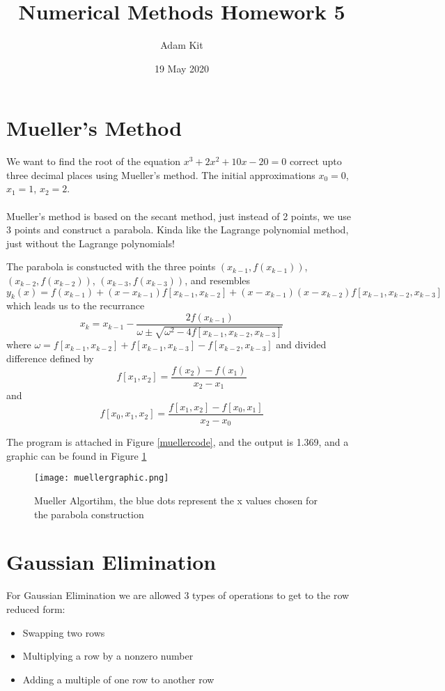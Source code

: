 \documentclass{article}
\title{Numerical Methods Homework 5}
\author{Adam Kit}
\date{19 May 2020}
\begin{document}
\maketitle
\section{Mueller's Method}
We want to find the root of the equation $x^3 + 2x^2 + 10x - 20 = 0$ correct upto three decimal places using Mueller's method. The initial approximations $x_0 = 0$, $x_1 = 1$, $x_2 = 2$.
\\  \\
Mueller's method is based on the secant method, just instead of 2 points, we use 3 points and construct a parabola. Kinda like the Lagrange polynomial method, just without the Lagrange polynomials!

The parabola is constucted with the three points $(x_{k-1}, f(x_{k-1}))$, $(x_{k-2}, f(x_{k-2}))$, $(x_{k-3}, f(x_{k-3}))$, and resembles $$y_k(x) = f(x_{k-1}) + (x-x_{k-1}) f[x_{k-1}, x_{k-2}] + (x-x_{k-1}) (x-x_{k-2}) f[x_{k-1}, x_{k-2}, x_{k-3}]$$ which leads us to the recurrance
$$x_k = x_{k-1} - \frac{2f(x_{k-1})}{\omega \pm \sqrt{\omega^2 - 4f[x_{k-1}, x_{k-2}, x_{k-3}]}} $$ where $\omega = f[x_{k-1}, x_{k-2}] + f[x_{k-1}, x_{k-3}] - f[x_{k-2}, x_{k-3}]$ and divided difference defined by  $$f[x_1, x_2] =  \frac{f(x_2) - f(x_1)}{x_2 - x_1}$$ and
$$f[x_0, x_1, x_2] = \frac{f[x_1, x_2] - f[x_0, x_1]}{x_2 - x_0} $$

The program is attached in Figure \ref{muellercode}, and the output is 1.369, and a graphic can be found in Figure \ref{muellergraphic}

\begin{figure}
  \centering
  \texttt{[image: muellergraphic.png]}
  \caption{Mueller Algortihm, the blue dots represent the x values chosen for the parabola construction}
  \label{muellergraphic}
\end{figure}


\section{Gaussian Elimination}
For Gaussian Elimination we are allowed 3 types of operations to get to the row reduced form:

\begin{itemize}
 \item Swapping two rows
 \item Multiplying a row by a nonzero number
 \item Adding a multiple of one row to another row
\end{itemize}
\end{document}
